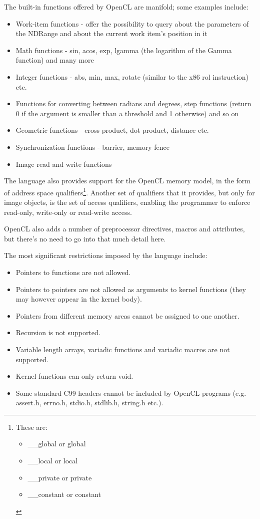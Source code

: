 The built-in functions offered by OpenCL are manifold; some examples include:
\begin{itemize}
\item Work-item functions - offer the possibility to query about the parameters of the NDRange and about the current work item's position in it
\item Math functions - sin, acos, exp, lgamma (the logarithm of the Gamma function) and many more
\item Integer functions - abs, min, max, rotate (similar to the x86 rol instruction) etc.
\item Functions for converting between radians and degrees, step functions (return 0 if the argument is smaller than a threshold and 1 otherwise) and so on
\item Geometric functions - cross product, dot product, distance etc.
\item Synchronization functions - barrier, memory fence
\item Image read and write functions
\end{itemize}

The language also provides support for the OpenCL memory model, in the form of address space qualifiers\footnote{These are:
\begin{itemize}
\item \_\_global or global
\item \_\_local or local
\item \_\_private or private
\item \_\_constant or constant
\end{itemize}
}. Another set of qualifiers that it provides, but only for image objects, is the set of access qualifiers, enabling the programmer to enforce read-only, write-only or read-write access.

OpenCL also adds a number of preprocessor directives, macros and attributes, but there's no need to go into that much detail here.

The most significant restrictions imposed by the language include:
\begin{itemize}
\item Pointers to functions are not allowed.
\item Pointers to pointers are not allowed as arguments to kernel functions (they may however appear in the kernel body).
\item Pointers from different memory areas cannot be assigned to one another.
\item Recursion is not supported.
\item Variable length arrays, variadic functions and variadic macros are not supported.
\item Kernel functions can only return void.
\item Some standard C99 headers cannot be included by OpenCL programs (e.g. assert.h, errno.h, stdio.h, stdlib.h, string.h etc.).
\end{itemize}

